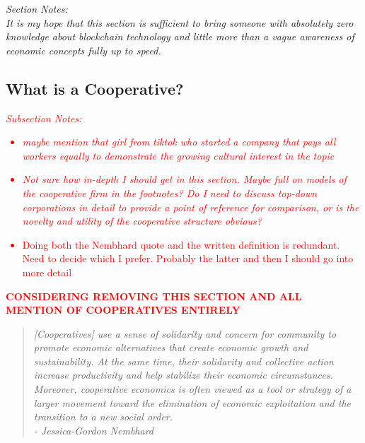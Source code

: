 \documentclass{article}[10pt]
\begin{document}
\textit{Section Notes:}\\
\textit{It is my hope that this section is sufficient to bring someone with absolutely zero knowledge about blockchain technology and little more than a vague awareness of economic concepts fully up to speed.}


\subsection{What is a Cooperative?}
\label{subsection:cooperative}

\textcolor{red}{\textit{Subsection Notes:}}
\textcolor{red}{\begin{itemize}
    \item \textit{maybe mention that girl from tiktok who started a company that pays all workers equally to demonstrate the growing cultural interest in the topic}\
    \item \textit{Not sure how in-depth I should get in this section. Maybe full on models of the cooperative firm in the footnotes? Do I need to discuss top-down corporations in detail to provide a point of reference for comparison, or is the novelty and utility of the cooperative structure obvious?}
    \item Doing both the Nembhard quote and the written definition is redundant. Need to decide which I prefer. Probably the latter and then I should go into more detail
\end{itemize}}

\textcolor{red}{\textbf{CONSIDERING REMOVING THIS SECTION AND ALL MENTION OF COOPERATIVES ENTIRELY}}

\begin{quotation}
\textit{[Cooperatives] use a sense of solidarity and concern for community to promote economic alternatives that create economic growth and sustainability. At the same time, their solidarity and collective action increase productivity and help stabilize their economic circumstances. Moreover, cooperative economics is often viewed as a tool or strategy of a larger movement toward the elimination of economic exploitation and the transition to a new social order.} \\
\textit{- Jessica-Gordon Nembhard \autocite{nembhard2021collective}}
\end{quotation}
\end{document}
